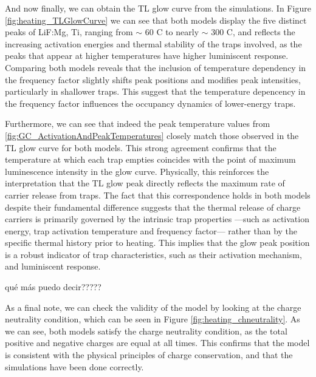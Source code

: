 And now finally, we can obtain the TL glow curve from the simulations. In Figure \ref{fig:heating_TLGlowCurve} we can see that both models display the five distinct peaks of LiF:Mg, Ti, ranging from $\sim$ 60 \textdegree C to nearly $\sim$ 300 \textdegree C, and reflects the increasing activation energies and thermal stability of the traps involved, as the peaks that appear at higher temperatures have higher luminiscent response. Comparing both models reveals that the inclusion of temperature dependency in the frequency factor slightly shifts peak positions and modifies peak intensities, particularly in shallower traps. This suggest that the temperature depencency in the frequency factor influences the occupancy dynamics of lower-energy traps. 

\vspace{10pt}

Furthermore, we can see that indeed the peak temperature values from \ref{fig:GC_ActivationAndPeakTemperatures} closely match those observed in the TL glow curve for both models. This strong agreement confirms that the temperature at which each trap empties coincides with the point of maximum luminescence intensity in the glow curve. Physically, this reinforces the interpretation that the TL glow peak directly reflects the maximum rate of carrier release from traps. The fact that this correspondence holds in both models despite their fundamental difference suggests that the thermal release of charge carriers is primarily governed by the intrinsic trap properties ---such as activation energy, trap activation temperature and frequency factor--- rather than by the specific thermal history prior to heating. This implies that the glow peak position is a robust indicator of trap characteristics, such as their activation mechanism, and luminiscent response. 

qué más puedo decir?????

\vspace{10pt}

As a final note, we can check the validity of the model by looking at the charge neutrality condition, which can be seen in Figure \ref{fig:heating_chneutrality}. As we can see, both models satisfy the charge neutrality condition, as the total positive and negative charges are equal at all times. This confirms that the model is consistent with the physical principles of charge conservation, and that the simulations have been done correctly.

